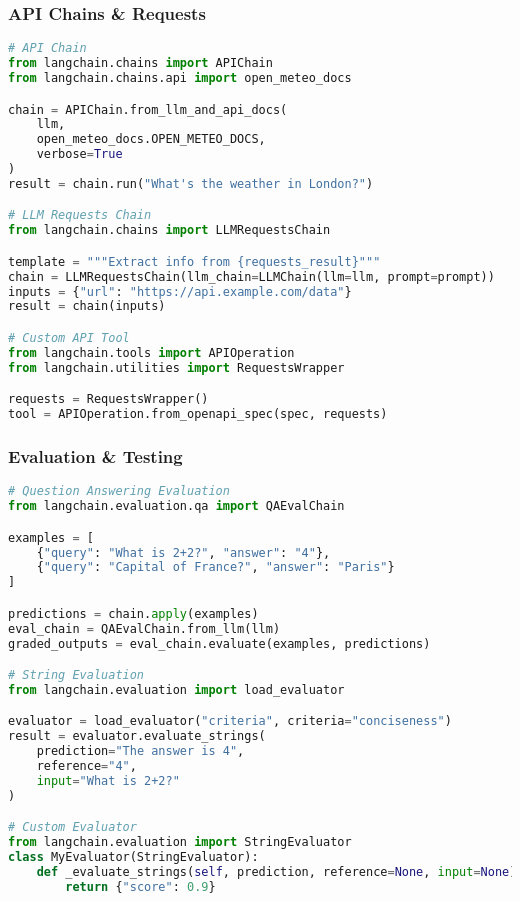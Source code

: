 \begin{frame}[fragile]\frametitle{API Chains \& Requests}
\begin{lstlisting}[language=python,basicstyle=\tiny]
# API Chain
from langchain.chains import APIChain
from langchain.chains.api import open_meteo_docs

chain = APIChain.from_llm_and_api_docs(
    llm,
    open_meteo_docs.OPEN_METEO_DOCS,
    verbose=True
)
result = chain.run("What's the weather in London?")

# LLM Requests Chain
from langchain.chains import LLMRequestsChain

template = """Extract info from {requests_result}"""
chain = LLMRequestsChain(llm_chain=LLMChain(llm=llm, prompt=prompt))
inputs = {"url": "https://api.example.com/data"}
result = chain(inputs)

# Custom API Tool
from langchain.tools import APIOperation
from langchain.utilities import RequestsWrapper

requests = RequestsWrapper()
tool = APIOperation.from_openapi_spec(spec, requests)
\end{lstlisting}
\end{frame}

\begin{frame}[fragile]\frametitle{Evaluation \& Testing}
\begin{lstlisting}[language=python,basicstyle=\tiny]
# Question Answering Evaluation
from langchain.evaluation.qa import QAEvalChain

examples = [
    {"query": "What is 2+2?", "answer": "4"},
    {"query": "Capital of France?", "answer": "Paris"}
]

predictions = chain.apply(examples)
eval_chain = QAEvalChain.from_llm(llm)
graded_outputs = eval_chain.evaluate(examples, predictions)

# String Evaluation
from langchain.evaluation import load_evaluator

evaluator = load_evaluator("criteria", criteria="conciseness")
result = evaluator.evaluate_strings(
    prediction="The answer is 4",
    reference="4",
    input="What is 2+2?"
)

# Custom Evaluator
from langchain.evaluation import StringEvaluator
class MyEvaluator(StringEvaluator):
    def _evaluate_strings(self, prediction, reference=None, input=None):
        return {"score": 0.9}
\end{lstlisting}
\end{frame}

